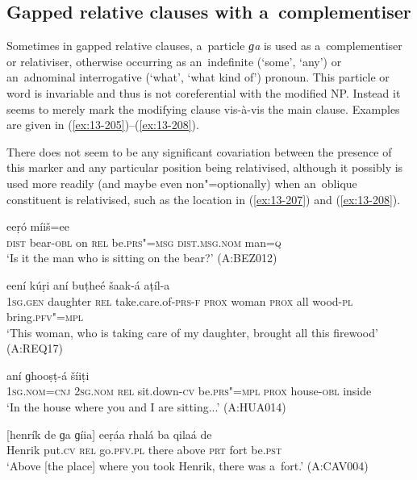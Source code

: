 \subsection{Gapped relative clauses with a~complementiser}
\label{subsec:13-6-4}


Sometimes in gapped relative clauses, a~particle \textit{ɡa} is used as a~complementiser or relativiser, otherwise occurring as an~indefinite (`some', `any') or an~adnominal interrogative (`what', `what kind of') pronoun. This particle or word is invariable and thus is not coreferential with the modified NP. Instead it seems to merely mark the modifying clause vis-à-vis the main clause. Examples are given in (\ref{ex:13-205})--(\ref{ex:13-208}).


There does not seem to be any significant covariation between the presence of this marker and any particular position being relativised, although it possibly is used more readily (and maybe even non"=optionally) when an~oblique constituent is relativised, such as the location in (\ref{ex:13-207}) and (\ref{ex:13-208}). 

\begin{exe}
\ex
\label{ex:13-205}
 eeṛó  míiš=ee \\
\textsc{dist} bear-\textsc{obl} on \textsc{rel} be.\textsc{prs"=msg} \textsc{dist.msg.nom}   man=\textsc{q} \\
\glt `Is it the man who is sitting on the bear?' (A:BEZ012)

\ex
\label{ex:13-206}
 eení kúṛi  aní buṭheé šaak-á aṭíl-a \\
\textsc{1sg.gen} daughter \textsc{rel} take.care.of-\textsc{prs-f} \textsc{prox} woman \textsc{prox} all wood-\textsc{pl} bring.\textsc{pfv"=mpl} \\
\glt `This woman, who is taking care of my daughter, brought all this firewood' (A:REQ17)

\ex
\label{ex:13-207}
\gll [máa=ee tu ɡa bheš-í hín-a]  aní ɡhooṣṭ-á šíiṭi \\
\textsc{1sg.nom=cnj} \textsc{2sg.nom} \textsc{rel} sit.down-\textsc{cv} be.\textsc{prs"=mpl} \textsc{prox} house-\textsc{obl} inside  \\
\glt `In the house where you and I are sitting...' (A:HUA014)

\ex
\label{ex:13-208}
\gll \label{bkm:Ref190845659}[henrík de ɡa ɡíia] eeṛáa rhalá ba  qilaá de \\
Henrik put.\textsc{cv} \textsc{rel} go.\textsc{pfv.pl}  there above \textsc{prt} fort be.\textsc{pst } \\
\glt `Above [the place] where you took Henrik, there was a~fort.' (A:CAV004) 
\end{exe}

